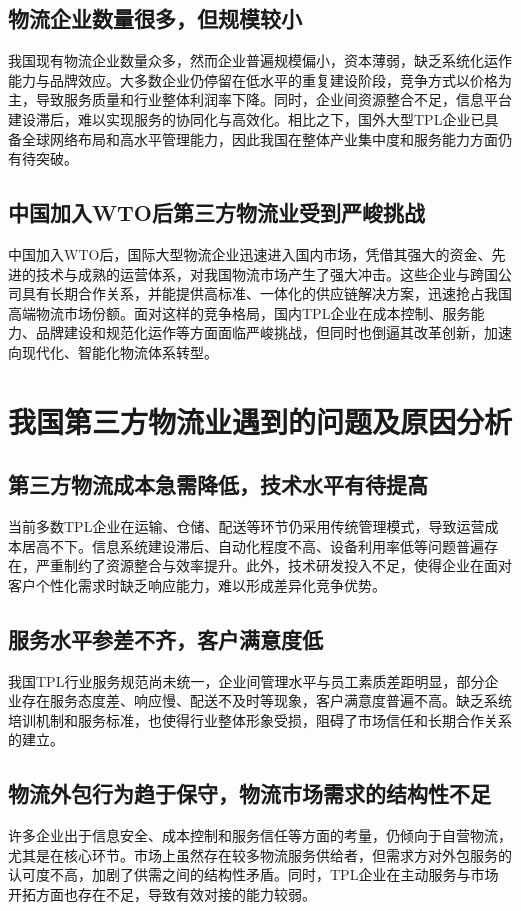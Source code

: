 \documentclass[UTF-8]{CUFEpaper}
\begin{document}
\subsection{物流企业数量很多，但规模较小}
我国现有物流企业数量众多，然而企业普遍规模偏小，资本薄弱，缺乏系统化运作能力与品牌效应。大多数企业仍停留在低水平的重复建设阶段，竞争方式以价格为主，导致服务质量和行业整体利润率下降。同时，企业间资源整合不足，信息平台建设滞后，难以实现服务的协同化与高效化。相比之下，国外大型TPL企业已具备全球网络布局和高水平管理能力，因此我国在整体产业集中度和服务能力方面仍有待突破。

\subsection{中国加入WTO后第三方物流业受到严峻挑战}
中国加入WTO后，国际大型物流企业迅速进入国内市场，凭借其强大的资金、先进的技术与成熟的运营体系，对我国物流市场产生了强大冲击。这些企业与跨国公司具有长期合作关系，并能提供高标准、一体化的供应链解决方案，迅速抢占我国高端物流市场份额。面对这样的竞争格局，国内TPL企业在成本控制、服务能力、品牌建设和规范化运作等方面面临严峻挑战，但同时也倒逼其改革创新，加速向现代化、智能化物流体系转型。

\section{我国第三方物流业遇到的问题及原因分析}
\subsection{第三方物流成本急需降低，技术水平有待提高}
当前多数TPL企业在运输、仓储、配送等环节仍采用传统管理模式，导致运营成本居高不下。信息系统建设滞后、自动化程度不高、设备利用率低等问题普遍存在，严重制约了资源整合与效率提升。此外，技术研发投入不足，使得企业在面对客户个性化需求时缺乏响应能力，难以形成差异化竞争优势。

\subsection{服务水平参差不齐，客户满意度低}
我国TPL行业服务规范尚未统一，企业间管理水平与员工素质差距明显，部分企业存在服务态度差、响应慢、配送不及时等现象，客户满意度普遍不高。缺乏系统培训机制和服务标准，也使得行业整体形象受损，阻碍了市场信任和长期合作关系的建立。

\subsection{物流外包行为趋于保守，物流市场需求的结构性不足}
许多企业出于信息安全、成本控制和服务信任等方面的考量，仍倾向于自营物流，尤其是在核心环节。市场上虽然存在较多物流服务供给者，但需求方对外包服务的认可度不高，加剧了供需之间的结构性矛盾。同时，TPL企业在主动服务与市场开拓方面也存在不足，导致有效对接的能力较弱。
\end{document}
